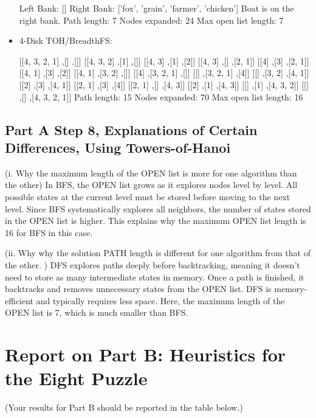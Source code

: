 \documentclass{article}
\begin{document}
\begin{itemize}
Left Bank: []
Right Bank: ['fox', 'grain', 'farmer', 'chicken']
Boat is on the right bank.
Path length: 7
Nodes expanded: 24
Max open list length: 7

 \item 4-Disk TOH/BreadthFS:

 [[4, 3, 2, 1] ,[] ,[]]
[[4, 3, 2] ,[1] ,[]]
[[4, 3] ,[1] ,[2]]
[[4, 3] ,[] ,[2, 1]]
[[4] ,[3] ,[2, 1]]
[[4, 1] ,[3] ,[2]]
[[4, 1] ,[3, 2] ,[]]
[[4] ,[3, 2, 1] ,[]]
[[] ,[3, 2, 1] ,[4]]
[[] ,[3, 2] ,[4, 1]]
[[2] ,[3] ,[4, 1]]
[[2, 1] ,[3] ,[4]]
[[2, 1] ,[] ,[4, 3]]
[[2] ,[1] ,[4, 3]]
[[] ,[1] ,[4, 3, 2]]
[[] ,[] ,[4, 3, 2, 1]]
Path length: 15
Nodes expanded: 70
Max open list length: 16

 \end{itemize}

 \subsection{Part A Step 8,  Explanations of Certain Differences, Using Towers-of-Hanoi  }

\begin{paragraph}
(i. Why the maximum length of the OPEN list is more for one algorithm
than the other)
In BFS, the OPEN list grows as it explores nodes level by level. All possible states at the current level must be stored before moving to the next level.
Since BFS systematically explores all neighbors, the number of states stored in the OPEN list is higher. This explains why the maximum OPEN list length is 16 for BFS in this case.

\end{paragraph}
\begin{paragraph}
(ii. Why why the solution PATH length is different for one algorithm from that of the other. )
DFS explores paths deeply before backtracking, meaning it doesn’t need to store as many intermediate states in memory. Once a path is finished, it backtracks and removes unnecessary states from the OPEN list.
DFS is memory-efficient and typically requires less space. Here, the maximum length of the OPEN list is 7, which is much smaller than BFS.
\end{paragraph}

\newpage
\section{Report on Part B: Heuristics for the Eight Puzzle}

(Your results for Part B should be reported in the table below.)
\end{document}
